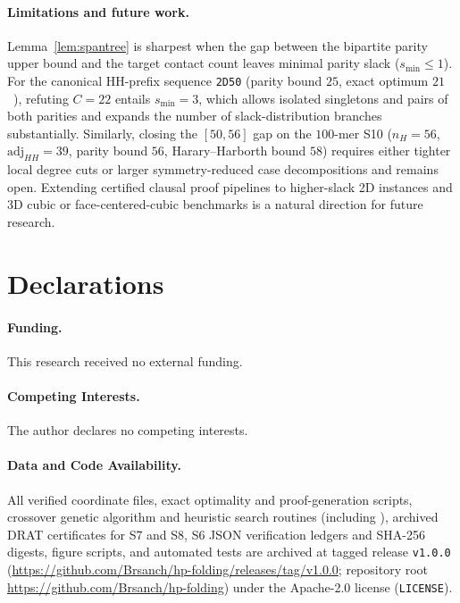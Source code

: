 \documentclass[11pt]{article}
\begin{document}
\paragraph{Limitations and future work.}
Lemma~\ref{lem:spantree} is sharpest when the gap between the bipartite parity upper bound and the target contact count leaves minimal parity slack ($s_{\min} \le 1$). For the canonical HH-prefix sequence \texttt{2D50} (parity bound $25$, exact optimum $21$~\cite{giaquinta2013}), refuting $C = 22$ entails $s_{\min} = 3$, which allows isolated singletons and pairs of both parities and expands the number of slack-distribution branches substantially. Similarly, closing the $[50, 56]$ gap on the $100$-mer S10 ($n_H = 56$, $\mathrm{adj}_{HH} = 39$, parity bound $56$, Harary--Harborth bound $58$) requires either tighter local degree cuts or larger symmetry-reduced case decompositions and remains open. Extending certified clausal proof pipelines to higher-slack 2D instances and 3D cubic or face-centered-cubic benchmarks is a natural direction for future research.

\section*{Declarations}

\paragraph{Funding.} This research received no external funding.

\paragraph{Competing Interests.} The author declares no competing interests.

\paragraph{Data and Code Availability.}
All verified coordinate files, exact optimality and proof-generation scripts, crossover genetic algorithm and heuristic search routines (including ), archived DRAT certificates for S7 and S8, S6 JSON verification ledgers and SHA-256 digests, figure scripts, and automated tests are archived at tagged release \texttt{v1.0.0} (\url{https://github.com/Brsanch/hp-folding/releases/tag/v1.0.0}; repository root \url{https://github.com/Brsanch/hp-folding}) under the Apache-2.0 license (\texttt{LICENSE}).
\end{document}
